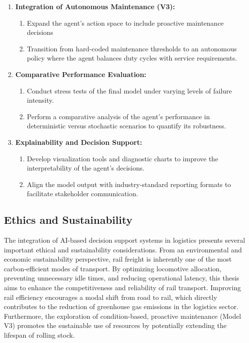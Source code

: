 \documentclass[a4paper]{scrartcl}
\begin{document}
\begin{enumerate}
    \item \textbf{Integration of Autonomous Maintenance (V3):}
    \begin{enumerate}
        \item Expand the agent's action space to include proactive maintenance decisions
        \item Transition from hard-coded maintenance thresholds to an autonomous policy where the agent balances duty cycles with service requirements.
    \end{enumerate}
    
    \item \textbf{Comparative Performance Evaluation:}
    \begin{enumerate}
        \item Conduct stress tests of the final model under varying levels of failure intensity.
        \item Perform a comparative analysis of the agent's performance in deterministic versus stochastic scenarios to quantify its robustness.
    \end{enumerate}
    
    \item \textbf{Explainability and Decision Support:}
    \begin{enumerate}
        \item Develop visualization tools and diagnostic charts to improve the interpretability of the agent's decisions.
        \item Align the model output with industry-standard reporting formats to facilitate stakeholder communication.
    \end{enumerate}
\end{enumerate}

\subsection{Ethics and Sustainability}
The integration of AI-based decision support systems in logistics presents several important ethical and sustainability considerations. From an environmental and economic sustainability perspective, rail freight is inherently one of the most carbon-efficient modes of transport. By optimizing locomotive allocation, preventing unnecessary idle times, and reducing operational latency, this thesis aims to enhance the competitiveness and reliability of rail transport. Improving rail efficiency encourages a modal shift from road to rail, which directly contributes to the reduction of greenhouse gas emissions in the logistics sector. Furthermore, the exploration of condition-based, proactive maintenance (Model V3) promotes the sustainable use of resources by potentially extending the lifespan of rolling stock.
\end{document}
